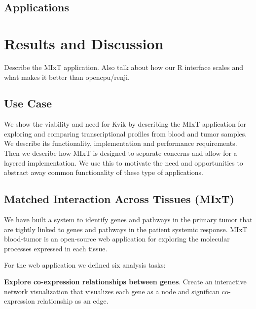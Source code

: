 \subsection*{Applications}




\section*{Results and Discussion}
Describe the MIxT application. Also talk about how our R interface scales and
what makes it better than opencpu/renji.


\subsection*{Use Case}
We show the viability and need for Kvik by describing the MIxT application for
exploring and comparing transcriptional profiles from blood and tumor samples.
We describe its functionality, implementation 
and performance requirements.
Then we describe how MIxT
is designed to separate concerns and allow for a layered implementation. We use
this to motivate the need and opportunities to abstract away common
functionality of these type of applications.

\subsection*{Matched Interaction Across Tissues (MIxT)}
We have built a system to identify genes and pathways in the primary tumor that
are tightly linked to genes and pathways in the patient systemic
response\cite{dumeaux2017}. MIxT blood-tumor is an open-source web application
for exploring the molecular processes expressed in each tissue. 

For the web application we defined six analysis tasks: 

\textbf{Explore co-expression relationships between genes}. Create an
interactive network visualization that visualizes each gene as a node and
significan co-expression relationship as an edge. 

